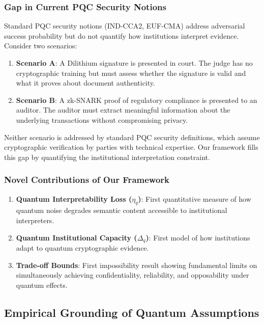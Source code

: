 \documentclass{ieeeaccess}
\begin{document}
\subsubsection{Gap in Current PQC Security Notions}

Standard PQC security notions (IND-CCA2, EUF-CMA) address adversarial success probability but do not quantify how institutions interpret evidence. Consider two scenarios:

\begin{enumerate}
    \item \textbf{Scenario A}: A Dilithium signature is presented in court. The judge has no cryptographic training but must assess whether the signature is valid and what it proves about document authenticity.

    \item \textbf{Scenario B}: A zk-SNARK proof of regulatory compliance is presented to an auditor. The auditor must extract meaningful information about the underlying transactions without compromising privacy.
\end{enumerate}

Neither scenario is addressed by standard PQC security definitions, which assume cryptographic verification by parties with technical expertise. Our framework fills this gap by quantifying the institutional interpretation constraint.

\subsubsection{Novel Contributions of Our Framework}

\begin{enumerate}
    \item \textbf{Quantum Interpretability Loss ($\eta_q$)}: First quantitative measure of how quantum noise degrades semantic content accessible to institutional interpreters.

    \item \textbf{Quantum Institutional Capacity ($\Delta_q$)}: First model of how institutions adapt to quantum cryptographic evidence.

    \item \textbf{Trade-off Bounds}: First impossibility result showing fundamental limits on simultaneously achieving confidentiality, reliability, and opposability under quantum effects.
\end{enumerate}

\subsection{Empirical Grounding of Quantum Assumptions}
\end{document}

